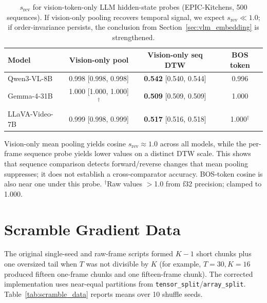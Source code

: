 \documentclass{article}
\theoremstyle{remark}
\begin{document}
\begin{table}[h]
\centering
\caption{$s_\text{rev}$ for vision-token-only LLM hidden-state probes (EPIC-Kitchens, 500 sequences). If vision-only pooling recovers temporal signal, we expect $s_\text{rev} \ll 1.0$; if order-invariance persists, the conclusion from Section~\ref{sec:vlm_embedding} is strengthened.}
\label{tab:vision_token_probe}
\begin{tabular}{lccc}
\toprule
\textbf{Model} & \textbf{Vision-only pool} & \textbf{Vision-only seq DTW} & \textbf{BOS token} \\
\midrule
Qwen3-VL-8B    & 0.998 [0.998, 0.998] & \textbf{0.542} [0.540, 0.544] & 0.996 \\
Gemma-4-31B    & 1.000 [1.000, 1.000]$^\dagger$ & \textbf{0.509} [0.509, 0.509] & 1.000 \\
LLaVA-Video-7B & 0.999 [0.998, 0.999] & \textbf{0.517} [0.516, 0.518] & 1.000$^\dagger$ \\
\bottomrule
\end{tabular}
\begin{flushleft}
\small Vision-only mean pooling yields cosine $s_\text{rev} \approx 1.0$ across all models, while the per-frame sequence probe yields lower values on a distinct DTW scale. This shows that sequence comparison detects forward/reverse changes that mean pooling suppresses; it does not establish a cross-comparator accuracy. BOS-token cosine is also near one under this probe. $^\dagger$Raw values $>$1.0 from f32 precision; clamped to 1.000.
\end{flushleft}
\end{table}

\section{Scramble Gradient Data}
\label{sec:scramble_data}

The original single-seed and raw-frame scripts formed $K-1$ short chunks plus one oversized tail when $T$ was not divisible by $K$ (for example, $T\!=\!30,K\!=\!16$ produced fifteen one-frame chunks and one fifteen-frame chunk). The corrected implementation uses near-equal partitions from \texttt{tensor\_split}/\texttt{array\_split}. Table~\ref{tab:scramble_data} reports means over 10 shuffle seeds.
\end{document}
